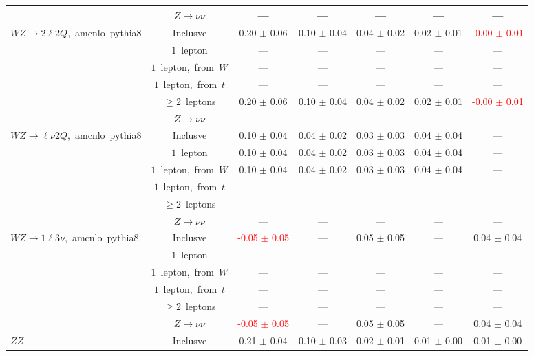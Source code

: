 \documentclass{article}
\begin{document}
\begin{longtable}{|l|c|c|c|c|c|c|}
 & $Z\rightarrow\nu\nu$  & ---  & ---  & ---  & ---  & --- \\* 
\hline 
\multirow{6}{*}{$WZ{\rightarrow}2{\ell}2Q$,~amcnlo~pythia8} & Inclusve  & 0.20 $\pm$ 0.06  & 0.10 $\pm$ 0.04  & 0.04 $\pm$ 0.02  & 0.02 $\pm$ 0.01  & \textcolor{red}{ -0.00 $\pm$ 0.01 } \\* 
 & $1$~lepton  & ---  & ---  & ---  & ---  & --- \\* 
 & $1$~lepton,~from~$W$  & ---  & ---  & ---  & ---  & --- \\* 
 & $1$~lepton,~from~$t$  & ---  & ---  & ---  & ---  & --- \\* 
 & $\ge2$~leptons  & 0.20 $\pm$ 0.06  & 0.10 $\pm$ 0.04  & 0.04 $\pm$ 0.02  & 0.02 $\pm$ 0.01  & \textcolor{red}{ -0.00 $\pm$ 0.01 } \\* 
 & $Z\rightarrow\nu\nu$  & ---  & ---  & ---  & ---  & --- \\* 
\hline 
\multirow{6}{*}{$WZ{\rightarrow}{\ell}{\nu}2Q$,~amcnlo~pythia8} & Inclusve  & 0.10 $\pm$ 0.04  & 0.04 $\pm$ 0.02  & 0.03 $\pm$ 0.03  & 0.04 $\pm$ 0.04  & --- \\* 
 & $1$~lepton  & 0.10 $\pm$ 0.04  & 0.04 $\pm$ 0.02  & 0.03 $\pm$ 0.03  & 0.04 $\pm$ 0.04  & --- \\* 
 & $1$~lepton,~from~$W$  & 0.10 $\pm$ 0.04  & 0.04 $\pm$ 0.02  & 0.03 $\pm$ 0.03  & 0.04 $\pm$ 0.04  & --- \\* 
 & $1$~lepton,~from~$t$  & ---  & ---  & ---  & ---  & --- \\* 
 & $\ge2$~leptons  & ---  & ---  & ---  & ---  & --- \\* 
 & $Z\rightarrow\nu\nu$  & ---  & ---  & ---  & ---  & --- \\* 
\hline 
\multirow{6}{*}{$WZ{\rightarrow}1{\ell}3{\nu}$,~amcnlo~pythia8} & Inclusve  & \textcolor{red}{ -0.05 $\pm$ 0.05 }  & ---  & 0.05 $\pm$ 0.05  & ---  & 0.04 $\pm$ 0.04 \\* 
 & $1$~lepton  & ---  & ---  & ---  & ---  & --- \\* 
 & $1$~lepton,~from~$W$  & ---  & ---  & ---  & ---  & --- \\* 
 & $1$~lepton,~from~$t$  & ---  & ---  & ---  & ---  & --- \\* 
 & $\ge2$~leptons  & ---  & ---  & ---  & ---  & --- \\* 
 & $Z\rightarrow\nu\nu$  & \textcolor{red}{ -0.05 $\pm$ 0.05 }  & ---  & 0.05 $\pm$ 0.05  & ---  & 0.04 $\pm$ 0.04 \\* 
\hline 
\multirow{6}{*}{$ZZ$} & Inclusve  & 0.21 $\pm$ 0.04  & 0.10 $\pm$ 0.03  & 0.02 $\pm$ 0.01  & 0.01 $\pm$ 0.00  & 0.01 $\pm$ 0.00 \\* 

\end{longtable}
\end{document}
